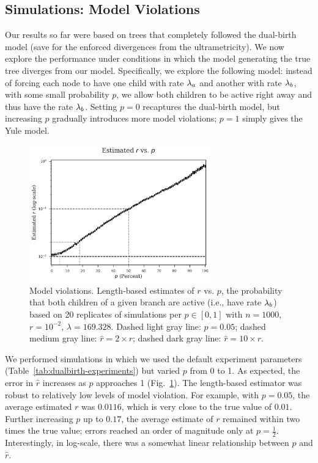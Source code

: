 \subsection{Simulations: Model Violations}
Our results so far were based on trees that completely followed the dual-birth model (save for the enforced divergences from the ultrametricity). We now explore the performance under conditions in which the  model generating the true tree diverges from our model. Specifically, we explore the following model: instead of forcing each node to have one child with rate $\lambda_a$ and another with rate $\lambda_b$, with some small probability $p$, we allow both children to be active right away and thus have the rate $\lambda_b$. Setting $p=0$ recaptures the dual-birth model, but increasing $p$ gradually introduces more model violations; $p=1$ simply gives the Yule model.

\begin{figure} %
\centering
\includegraphics[width=0.7\textwidth]{figs/dualbirth-model-violations}
\caption[Model Violations]
{Model violations. Length-based estimates of $r$ vs. $p$, the probability that both children of a given branch are active (i.e., have rate $\lambda_b$) based on 20 replicates of simulations per $p\in[0,1]$ with $n=1000$, $r=10^{-2}$, $\lambda=169.328$. Dashed light gray line: $p=0.05$; dashed medium gray line: $\hat{r}=2\times r$; dashed dark gray line: $\hat{r}=10\times r$.}
\label{fig:dualbirth-model-violations}
\end{figure}

We performed simulations in which we used the default experiment parameters (Table~\ref{tab:dualbirth-experiments}) but varied $p$ from 0 to 1. As expected, the error in $\hat{r}$ increases as $p$ approaches 1 (Fig.~\ref{fig:dualbirth-model-violations}). The length-based estimator was  robust to relatively low levels of model violation. For example, with $p=0.05$, the average estimated $r$ was $0.0116$, which is very close to the true value of $0.01$. Further increasing $p$ up to $0.17$, the average estimate of $r$ remained within two times the true value; errors reached an order of magnitude only at $p=\frac{1}{2}$. Interestingly, in log-scale, there was a somewhat linear relationship between $p$ and $\hat{r}$.

